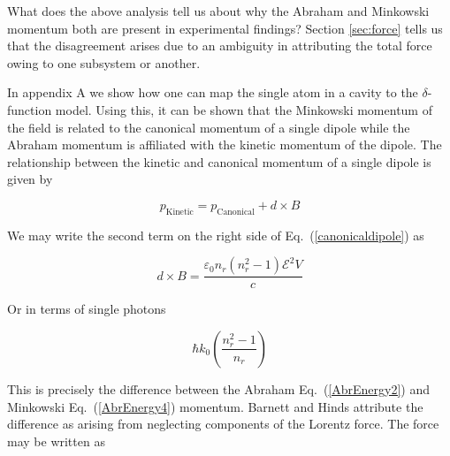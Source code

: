 \documentclass[twocolumn,english,pra,aps,superscriptaddress,floatfix]{revtex4-1}
\begin{document}
What does the above analysis tell us about why the Abraham and Minkowski momentum both are present in experimental findings?  Section \ref{sec:force} tells us that the disagreement arises due to an ambiguity in attributing the total force owing to one subsystem or another.  

In appendix A we show how one can map the single atom in a cavity to the $\delta$-function model.  Using this, it can be shown that the Minkowski momentum of the field is related to the canonical momentum of a single dipole while the Abraham momentum is affiliated with the kinetic momentum of the dipole.  The relationship between the kinetic and canonical momentum of a single dipole is given by \cite{hinds}

\begin{equation}
p_{\mathrm{Kinetic}}=p_{\mathrm{Canonical}}+d \times B
\label{canonicaldipole}
\end{equation}
 
We may write the second term on the right side of Eq.\ (\ref{canonicaldipole}) as 

\begin{equation}
d \times B =\frac{\varepsilon_{0} n_{r}\left(n_{r}^2-1\right)\mathcal{E}^2V}{c}
\label{dipoleterm1}
\end{equation}

Or in terms of single photons

\begin{equation}
\hbar k_{0} \left(\frac{n_{r}^2-1}{n_{r}}\right)
\label{dipoleterm2}
\end{equation}

This is precisely the difference between the Abraham Eq.\ (\ref{AbrEnergy2}) and Minkowski Eq.\ (\ref{AbrEnergy4}) momentum. 
Barnett and Hinds \cite{Hinds} attribute the difference as arising from neglecting components of the Lorentz force.  The force may be written as 
  
\end{document}
